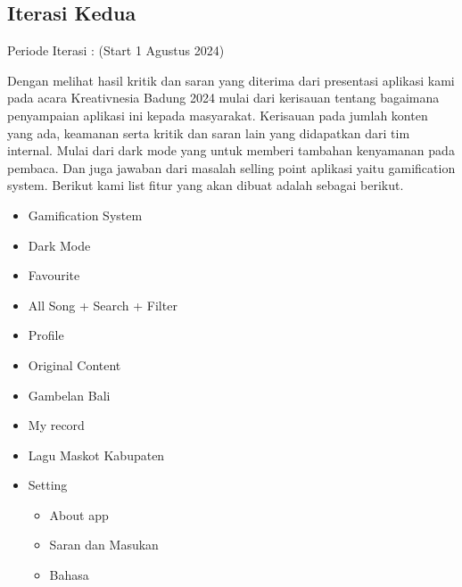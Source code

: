 \subsection{Iterasi Kedua}
Periode Iterasi : (Start 1 Agustus 2024)

Dengan melihat hasil kritik dan saran yang diterima dari presentasi aplikasi kami pada acara
Kreativnesia Badung 2024 mulai dari kerisauan tentang bagaimana penyampaian aplikasi ini kepada masyarakat.
Kerisauan pada jumlah konten yang ada, keamanan serta kritik dan saran lain yang didapatkan dari tim internal.
Mulai dari dark mode yang untuk memberi tambahan kenyamanan pada pembaca. Dan juga jawaban dari masalah
selling point aplikasi yaitu gamification system. Berikut kami list fitur yang akan dibuat adalah sebagai
berikut.

\begin{itemize}
    \item Gamification System
    \item Dark Mode
    \item Favourite
    \item All Song + Search + Filter
    \item Profile
    \item Original Content
    \item Gambelan Bali
    \item My record
    \item Lagu Maskot Kabupaten
    \item Setting
    \begin{itemize}
        \item About app
        \item Saran dan Masukan
        \item Bahasa
    \end{itemize}

\end{itemize}

